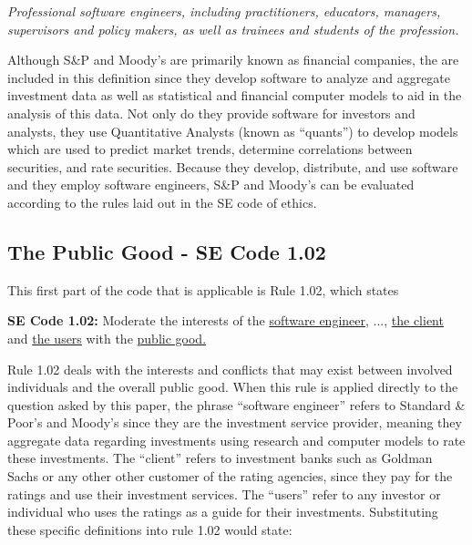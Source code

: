 \documentclass[11pt]{article}
\begin{document}
\begin{multicols}{2}
\textit{Professional software engineers, including practitioners, educators, managers, supervisors and policy makers, as well as trainees and students of the profession.}
\newline

Although S\&P and Moody's are primarily known as financial companies, the are included in this definition since they develop software to analyze and aggregate investment data \cite{SnP, Moodys} as well as statistical and financial computer models to aid in the analysis of this data. \cite{govtReport} Not only do they provide software for investors and analysts, they use Quantitative Analysts (known as ``quants'') to develop models which are used to predict market trends, determine correlations between securities, and rate securities. \cite{quantsRole, govtReport, wiredFormula}  Because they develop, distribute, and use software and they employ software engineers, S\&P and Moody's can be evaluated according to the rules laid out in the SE code of ethics. 

\subsection{The Public Good - SE Code 1.02}
This first part of the code that is applicable is Rule 1.02, which states
 
\begin{framed}
\noindent
   \textbf{SE Code 1.02: }     
   \newline
   Moderate the interests of the \underline{software engineer}, ..., \underline{the client} and \underline{the users} with the \underline{public good.} \cite{SEcode}
\end{framed}

Rule 1.02 deals with the interests and conflicts that may exist between involved individuals and the overall public good.  When this rule is applied directly to the question asked by this paper, the phrase ``software engineer'' refers to Standard \& Poor's and Moody's since they are the investment service provider, meaning they aggregate data regarding investments using research and computer models to rate these investments. The ``client'' refers to investment banks such as Goldman Sachs or any other other customer of the rating agencies, since they pay for the ratings and use their investment services.  The ``users'' refer to any investor or individual who uses the ratings as a guide for their investments.  Substituting these specific definitions into rule 1.02 would state:


\end{multicols}
\end{document}
